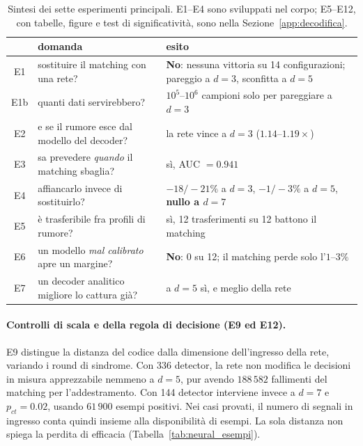 \begin{onehalfspace}
\begin{table}[H]
\centering
\small
\begin{tabularx}{\textwidth}{cXX}
\toprule
 & \textbf{domanda} & \textbf{esito} \\
\midrule
E1 & sostituire il matching con una rete? & \textbf{No}: nessuna vittoria su 14 configurazioni; pareggio a $d=3$, sconfitta a $d=5$ \\
E1b & quanti dati servirebbero? & $10^5$--$10^6$ campioni solo per pareggiare a $d=3$ \\
E2 & e se il rumore esce dal modello del decoder? & la rete vince a $d=3$ ($1.14$--$1.19\times$) \\
E3 & sa prevedere \emph{quando} il matching sbaglia? & sì, \ac{AUC} $=0.941$ \\
E4 & affiancarlo invece di sostituirlo? & $-18/-21\%$ a $d=3$, $-1/-3\%$ a $d=5$, \textbf{nullo a $d=7$} \\
E5 & è trasferibile fra profili di rumore? & sì, 12 trasferimenti su 12 battono il matching \\
E6 & un modello \emph{mal calibrato} apre un margine? & \textbf{No}: 0 su 12; il matching perde solo l'$1$--$3\%$ \\
E7 & un decoder analitico migliore lo cattura già? & a $d=5$ sì, e meglio della rete \\
\bottomrule
\end{tabularx}
\caption[Sintesi della campagna sulla decodifica appresa]{Sintesi dei
sette esperimenti principali. E1--E4 sono sviluppati nel corpo; E5--E12,
con tabelle, figure e test di significatività, sono nella
Sezione~\ref{app:decodifica}.}
\label{tab:sintesi_decodifica}
\end{table}

\paragraph{Controlli di scala e della regola di decisione (E9 ed E12).}
E9 distingue la distanza del codice dalla dimensione dell'ingresso della rete, variando i round di sindrome. Con 336 detector, la rete non modifica le decisioni in misura apprezzabile nemmeno a $d=5$, pur avendo $188\,582$ fallimenti del matching per l'addestramento. Con 144 detector interviene invece a $d=7$ e $p_{ct}=0.02$, usando $61\,900$ esempi positivi. Nei casi provati, il numero di segnali in ingresso conta quindi insieme alla disponibilità di esempi. La sola distanza non spiega la perdita di efficacia (Tabella~\ref{tab:neural_esempi}).


\end{onehalfspace}

